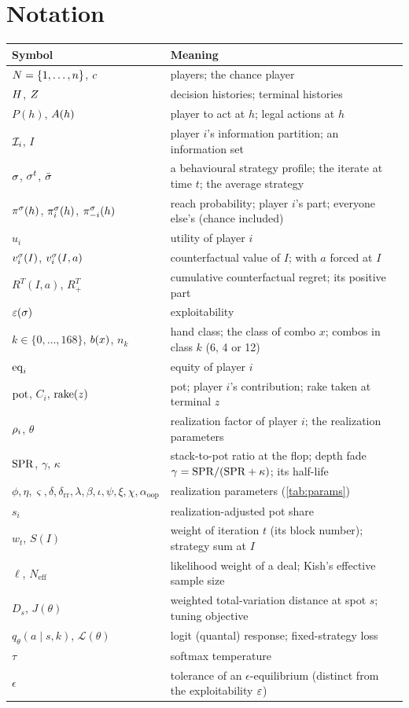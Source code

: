 \chapter*{Notation}
\begin{tabularx}{\linewidth}{@{}lX@{}}
\toprule
Symbol & Meaning \\
\midrule
$N = \{1,\dots,n\}$, $c$ & players; the chance player \\
$H$, $Z$ & decision histories; terminal histories \\
$P(h)$, $A(h)$ & player to act at $h$; legal actions at $h$ \\
$\mathcal{I}_i$, $I$ & player $i$'s information partition; an information set \\
$\sigma$, $\sigma^t$, $\bar\sigma$ & a behavioural strategy profile; the iterate at time $t$; the average strategy \\
$\pi^\sigma(h)$, $\pi^\sigma_i(h)$, $\pi^\sigma_{-i}(h)$ & reach probability; player $i$'s part; everyone else's (chance included) \\
$u_i$ & utility of player $i$ \\
$v_i^\sigma(I)$, $v_i^\sigma(I,a)$ & counterfactual value of $I$; with $a$ forced at $I$ \\
$R^T(I,a)$, $R^T_+$ & cumulative counterfactual regret; its positive part \\
$\varepsilon(\sigma)$ & exploitability \\
$k \in \{0,\dots,168\}$, $b(x)$, $n_k$ & hand class; the class of combo $x$; combos in class $k$ (6, 4 or 12) \\
$\mathrm{eq}_i$ & equity of player $i$ \\
$\mathrm{pot}$, $C_i$, $\operatorname{rake}(z)$ & pot; player $i$'s contribution; rake taken at terminal $z$ \\
$\rho_i$, $\theta$ & realization factor of player $i$; the realization parameters \\
$\mathrm{SPR}$, $\gamma$, $\kappa$ & stack-to-pot ratio at the flop; depth fade $\gamma = \mathrm{SPR}/(\mathrm{SPR}+\kappa)$; its half-life \\
$\phi,\eta,\varsigma,\delta,\delta_{\mathrm{rr}},\lambda,\beta,\iota,\psi,\xi,\chi,\alpha_{\mathrm{oop}}$ & realization parameters (\cref{tab:params}) \\
$s_i$ & realization-adjusted pot share \\
$w_t$, $S(I)$ & weight of iteration $t$ (its block number); strategy sum at $I$ \\
$\ell$, $N_{\mathrm{eff}}$ & likelihood weight of a deal; Kish's effective sample size \\
$D_s$, $J(\theta)$ & weighted total-variation distance at spot $s$; tuning objective \\
$q_\theta(a\mid s,k)$, $\mathcal L(\theta)$ & logit (quantal) response; fixed-strategy loss \\
$\tau$ & softmax temperature \\
$\epsilon$ & tolerance of an $\epsilon$-equilibrium (distinct from the exploitability $\varepsilon$) \\
\bottomrule
\end{tabularx}
